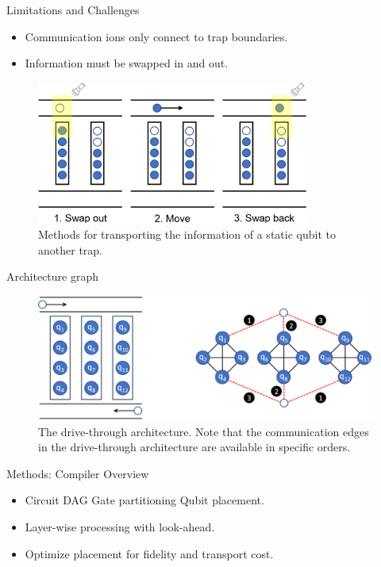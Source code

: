 \documentclass{beamer}
\begin{document}
	\begin{frame}{Limitations and Challenges}
		\begin{itemize}
			\item Communication ions only connect to trap boundaries.
			\item Information must be swapped in and out.
		\end{itemize}
		\begin{figure}
			\includegraphics[width=0.8\textwidth]{figure/move.png}
			\caption[]{Methods for transporting the information of a static qubit to another trap.}
		\end{figure}
	\end{frame}
	\begin{frame}{Architecture graph}
		\begin{figure}
			\includegraphics[width=.8\textwidth]{figure/graph.png}
			\caption[]{The drive-through architecture. Note that the communication edges in the drive-through architecture are available in specific orders.}
		\end{figure}
	\end{frame}
	\begin{frame}{Methods: Compiler Overview}
		\begin{itemize}
			\item Circuit \textrightarrow{} DAG \textrightarrow{} Gate partitioning \textrightarrow{} Qubit placement.
			\item Layer-wise processing with look-ahead.
			\item Optimize placement for fidelity and transport cost.
		\end{itemize}
	\end{frame}
	
\end{document}
